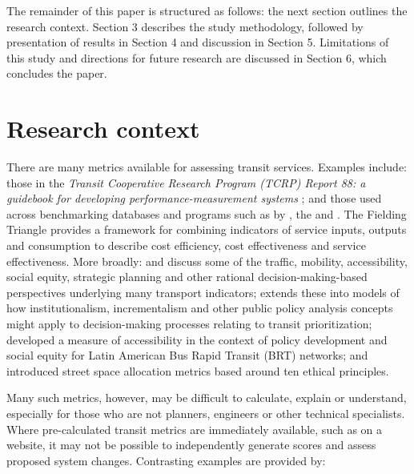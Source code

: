 \documentclass[preprint, 3p,
authoryear]{elsarticle} %
\begin{document}
The remainder of this paper is structured as follows: the next section
outlines the research context. Section 3 describes the study
methodology, followed by presentation of results in Section 4 and
discussion in Section 5. Limitations of this study and directions for
future research are discussed in Section 6, which concludes the paper.

\hypertarget{research-context}{%
\section{Research context}\label{research-context}}

There are many metrics available for assessing transit services.
Examples include: those in the \emph{Transit Cooperative Research
Program (TCRP) Report 88: a guidebook for developing
performance-measurement systems} \citep{Ryus:2003aa}; and those used
across benchmarking databases and programs such as by
\citet{Florida-Transit-Information-System:2018aa}, the
\citet{UITP:2015aa} and \citet{Imperial-College-London:2023aa}. The
Fielding Triangle \citep{FieldingGordonJ1987Mpts} provides a framework
for combining indicators of service inputs, outputs and consumption to
describe cost efficiency, cost effectiveness and service effectiveness.
More broadly: \citet{Litman:2003ab} and \citet{Litman:2016aa} discuss
some of the traffic, mobility, accessibility, social equity, strategic
planning and other rational decision-making-based perspectives
underlying many transport indicators; \citet{Reynolds:2017ah} extends
these into models of how institutionalism, incrementalism and other
public policy analysis concepts might apply to decision-making processes
relating to transit prioritization; \citet{GuzmanLuisA.2017Aeit}
developed a measure of accessibility in the context of policy
development and social equity for Latin American Bus Rapid Transit (BRT)
networks; and \citet{Creutzig2020streetspaceallocation} introduced
street space allocation metrics based around ten ethical principles.

Many such metrics, however, may be difficult to calculate, explain or
understand, especially for those who are not planners, engineers or
other technical specialists. Where pre-calculated transit metrics are
immediately available, such as on a website, it may not be possible to
independently generate scores and assess proposed system changes.
Contrasting examples are provided by:
\end{document}

